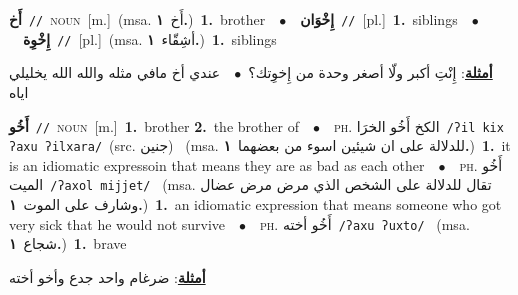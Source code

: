 \documentclass[10pt,a4paper,twoside]{article} %
\begin{document}
\begin{multicols}{2}
{\setlength\topsep{0pt}\textbf{\foreignlanguage{arabic}{أَخ}}\ {\color{gray}\texttt{//}\color{black}}\ \textsc{noun}\ [m.]\ \color{gray}(msa. \foreignlanguage{arabic}{أَخ}~\foreignlanguage{arabic}{\textbf{١.}})\color{black}\ \textbf{1.}~brother\ \ $\bullet$\ \ \setlength\topsep{0pt}\textbf{\foreignlanguage{arabic}{إِخْوَان}}\ {\color{gray}\texttt{//}\color{black}}\ [pl.]\ \textbf{1.}~siblings\ \ $\bullet$\ \ \setlength\topsep{0pt}\textbf{\foreignlanguage{arabic}{إِخْوِة}}\ {\color{gray}\texttt{//}\color{black}}\ [pl.]\ \color{gray}(msa. \foreignlanguage{arabic}{أشِقّاء}~\foreignlanguage{arabic}{\textbf{١.}})\color{black}\ \textbf{1.}~siblings\  \begin{flushright}\color{gray}\foreignlanguage{arabic}{\textbf{\underline{\foreignlanguage{arabic}{أمثلة}}}: إِنْتِ أكبر ولّا أصغر وحدة من إِخوِتك؟\ $\bullet$\ \  عندي أخ مافي مثله والله الله يخليلي اياه}\end{flushright}\color{black}} \vspace{2mm}

{\setlength\topsep{0pt}\textbf{\foreignlanguage{arabic}{أَخُو}}\ {\color{gray}\texttt{//}\color{black}}\ \textsc{noun}\ [m.]\ \textbf{1.}~brother  \textbf{2.}~the brother of\ \ $\bullet$\ \ \textsc{ph.} \color{gray} \foreignlanguage{arabic}{الكخ أَخُو الخرَا}\color{black}\ {\color{gray}\texttt{/{\sffamily ʔil kix ʔaxu ʔilxara}/}\color{black}}\ \color{gray}(src. \foreignlanguage{arabic}{جنين})\color{black}\ \color{gray} (msa. \foreignlanguage{arabic}{للدلالة على ان شيئين اسوء من بعضهما}~\foreignlanguage{arabic}{\textbf{١.}})\color{black}\ \textbf{1.}~it is an idiomatic expressoin that means they are as bad as each other\ \ $\bullet$\ \ \textsc{ph.} \color{gray} \foreignlanguage{arabic}{أَخُو الميت}\color{black}\ {\color{gray}\texttt{/{\sffamily ʔaxol mijjet}/}\color{black}}\ \color{gray} (msa. \foreignlanguage{arabic}{تقال للدلالة على الشخص الذي مرض مرض عضال وشارف على الموت}~\foreignlanguage{arabic}{\textbf{١.}})\color{black}\ \textbf{1.}~an idiomatic expression that means someone who got very sick that he would not survive\ \ $\bullet$\ \ \textsc{ph.} \color{gray} \foreignlanguage{arabic}{أَخُو أخته}\color{black}\ {\color{gray}\texttt{/{\sffamily ʔaxu ʔuxto}/}\color{black}}\ \color{gray} (msa. \foreignlanguage{arabic}{شجاع}~\foreignlanguage{arabic}{\textbf{١.}})\color{black}\ \textbf{1.}~brave\  \begin{flushright}\color{gray}\foreignlanguage{arabic}{\textbf{\underline{\foreignlanguage{arabic}{أمثلة}}}: ضرغام واحد جدع وأخو أخته}\end{flushright}\color{black}} \vspace{2mm}


\end{multicols}
\end{document}
